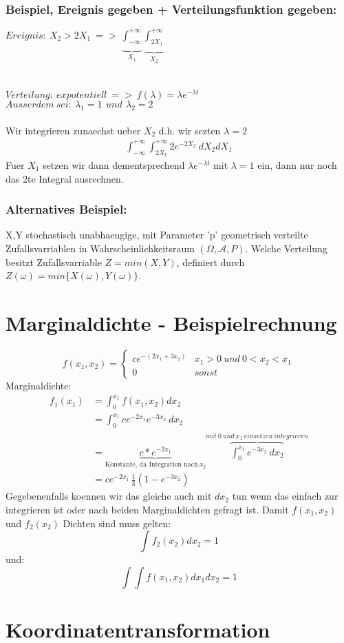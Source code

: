 \documentclass{article}
\begin{document}
	\subsubsection{Beispiel, Ereignis gegeben + Verteilungsfunktion gegeben:}
	$Ereignis: \: X_2 > 2X_1 \: => \: \underbrace{\int_{-\infty}^{+\infty}}_{X_1}
	\underbrace{\int_{2X_1}^{+\infty}}_{X_2}$\\ \\ \\
	$Verteilung: \: expotentiell \: => \: f(\lambda) = \lambda e^{-\lambda t}$ \\
	$Ausserdem \: sei: \:  \lambda_1 = 1 \:\, und \:\, \lambda_2 =2 $\\ \\
	Wir integrieren zunaechst ueber $X_2$ d.h. wir sezten $\lambda = 2$
	\[
		\begin{split}
			\int_{-\infty}^{+\infty} \int_{2X_1}^{+\infty} 2 e^{-2 X_2} \: dX_2 dX_1
		\end{split}
	\]
	Fuer $X_1$ setzen wir dann dementsprechend  $\lambda e^{-\lambda t}$ mit $\lambda = 1$ ein, dann nur noch das 2te Integral ausrechnen.
	\subsubsection{Alternatives Beispiel:}
	X,Y stochastisch unabhaengige, mit Parameter 'p' geometrisch verteilte Zufallsvarriablen 	in Wahrscheinlichkeitsraum $(\varOmega , \mathcal{A},P)$. Welche Verteilung besitzt 
Zufallsvarriable $Z = min(X,Y)$, definiert durch $Z( \omega ) = min \{X(\omega),Y(\omega)\}$.\\ \[
	
\]
\section{Marginaldichte - Beispielrechnung}
\[	
f(x_z,x_2)=
	\begin{cases}
		ce^{-(2x_1+3x_2)} & x_1  > 0 \: und \: 0 < x_2 <x_1 \\
		0 & sonst
	\end{cases}
\]
Marginaldichte:
\[
	\begin{split}
		f_1(x_1) 	& = \int_{0}^{x_1} f(x_1,x_2) dx_2 \\
					& = \int_{0}^{x_1} ce^{-2x_1}e^{-3x_2} \: dx_2 \\
					& = \underbrace{c*e^{-2x_1}}_{\text{Konstante, da Integration nach} \: x_2}  \overbrace{\int_{0}^{x_1} e^{-3x_2} \: dx_2}^{mit \: 0 \: und \: x_1 \: einsetzen \: integrieren} \\
					& = ce^{-2x_1}\, \frac{1}{3} (1-e^{-3x_2} )
	\end{split}
\]
Gegebenenfalls koennen wir das gleiche auch mit $dx_2$ tun wenn das einfach zur integrieren ist oder nach beiden Marginaldichten gefragt ist.
Damit $f(x_1,x_2)$ und $f_2(x_2)$ Dichten sind muss gelten:
\[
	\int f_2(x_2) dx_2 = 1
\]
und:
\[
	\int \int f(x_1,x_2) dx_1 dx_2 = 1
\]
\section{Koordinatentransformation}
\end{document}
